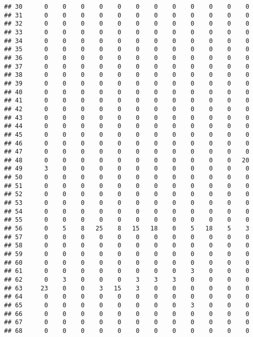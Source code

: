 \documentclass[]{article}
\begin{document}
\begin{verbatim}
## 30      0    0    0    0    0    0    0    0    0    0    0    0
## 31      0    0    0    0    0    0    0    0    0    0    0    0
## 32      0    0    0    0    0    0    0    0    0    0    0    0
## 33      0    0    0    0    0    0    0    0    0    0    0    0
## 34      0    0    0    0    0    0    0    0    0    0    0    0
## 35      0    0    0    0    0    0    0    0    0    0    0    0
## 36      0    0    0    0    0    0    0    0    0    0    0    0
## 37      0    0    0    0    0    0    0    0    0    0    0    0
## 38      0    0    0    0    0    0    0    0    0    0    0    0
## 39      0    0    0    0    0    0    0    0    0    0    0    0
## 40      0    0    0    0    0    0    0    0    0    0    0    0
## 41      0    0    0    0    0    0    0    0    0    0    0    0
## 42      0    0    0    0    0    0    0    0    0    0    0    0
## 43      0    0    0    0    0    0    0    0    0    0    0    0
## 44      0    0    0    0    0    0    0    0    0    0    0    0
## 45      0    0    0    0    0    0    0    0    0    0    0    0
## 46      0    0    0    0    0    0    0    0    0    0    0    0
## 47      0    0    0    0    0    0    0    0    0    0    0    0
## 48      0    0    0    0    0    0    0    0    0    0    0   20
## 49      3    0    0    0    0    0    0    0    0    0    0    0
## 50      0    0    0    0    0    0    0    0    0    0    0    0
## 51      0    0    0    0    0    0    0    0    0    0    0    0
## 52      0    0    0    0    0    0    0    0    0    0    0    0
## 53      0    0    0    0    0    0    0    0    0    0    0    0
## 54      0    0    0    0    0    0    0    0    0    0    0    0
## 55      0    0    0    0    0    0    0    0    0    0    0    0
## 56      0    5    8   25    8   15   18    0    5   18    5    3
## 57      0    0    0    0    0    0    0    0    0    0    0    0
## 58      0    0    0    0    0    0    0    0    0    0    0    0
## 59      0    0    0    0    0    0    0    0    0    0    0    0
## 60      0    0    0    0    0    0    0    0    0    0    0    0
## 61      0    0    0    0    0    0    0    0    3    0    0    0
## 62      0    3    0    0    0    3    3    3    0    0    0    0
## 63     23    0    0    3   15    3    0    0    0    0    0    0
## 64      0    0    0    0    0    0    0    0    0    0    0    0
## 65      0    0    0    0    0    0    0    0    3    0    0    0
## 66      0    0    0    0    0    0    0    0    0    0    0    0
## 67      0    0    0    0    0    0    0    0    0    0    0    0
## 68      0    0    0    0    0    0    0    0    0    0    0    0

\end{verbatim}
\end{document}
